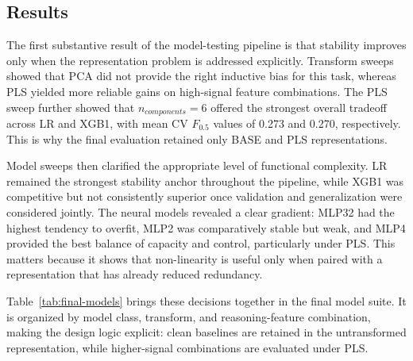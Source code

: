 \documentclass{article}
\theoremstyle{plain}
\theoremstyle{definition}
\theoremstyle{remark}
\begin{document}
\subsection{Results}
The first substantive result of the model-testing pipeline is that stability improves only when the representation problem is addressed explicitly. Transform sweeps showed that PCA did not provide the right inductive bias for this task, whereas PLS yielded more reliable gains on high-signal feature combinations. The PLS sweep further showed that $n_{components}=6$ offered the strongest overall tradeoff across LR and XGB1, with mean CV $F_{0.5}$ values of 0.273 and 0.270, respectively. This is why the final evaluation retained only BASE and PLS representations.

Model sweeps then clarified the appropriate level of functional complexity. LR remained the strongest stability anchor throughout the pipeline, while XGB1 was competitive but not consistently superior once validation and generalization were considered jointly. The neural models revealed a clear gradient: MLP32 had the highest tendency to overfit, MLP2 was comparatively stable but weak, and MLP4 provided the best balance of capacity and control, particularly under PLS. This matters because it shows that non-linearity is useful only when paired with a representation that has already reduced redundancy.

Table~\ref{tab:final-models} brings these decisions together in the final model suite. It is organized by model class, transform, and reasoning-feature combination, making the design logic explicit: clean baselines are retained in the untransformed representation, while higher-signal combinations are evaluated under PLS.

\begin{table}[t]
\centering
\small
{}
\caption{Final model suite (validation and private-test).}
\label{tab:final-models}
\end{table}
\end{document}
